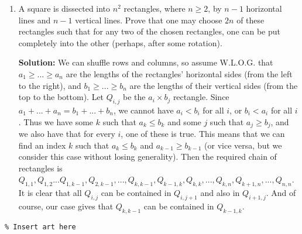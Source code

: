 \documentclass{article}
\begin{document}
\begin{enumerate}[itemsep=\fill]
\item %
A square is dissected into $n^2$ rectangles, where $n\geq 2$, by $n-1$ horizontal lines and $n-1$ vertical lines. Prove that one may choose $2n$ of these rectangles such that for any two of the chosen rectangles, one can be put completely into the other (perhaps, after some rotation).

\textbf{Solution:} We can shuffle rows and columns, so assume W.L.O.G. that $a_1\geq ... \geq a_n$ are the lengths of the rectangles' horizontal sides (from the left to the right), and $b_1\geq ...\geq b_n$ are the lengths of their vertical sides (from the top to the bottom). Let $Q_{i,j}$ be the $a_i\times b_j$ rectangle. Since $a_1+...+a_n=b_1+...+b_n$, we cannot have $a_i<b_i$ for all $i$, or $b_i<a_i$ for all $i$. Thus we have some $k$ such that $a_k\leq b_k$ and some $j$ such that $a_j\geq b_j$, and we also have that for every $i$, one of these is true. This means that we can find an index $k$ such that $a_k\leq b_k$ and $a_{k-1}\geq b_{k-1}$ (or vice versa, but we consider this case without losing generality). Then the required chain of rectangles is $Q_{1,1},Q_{1,2}...Q_{1,k-1},Q_{2,k-1},...,Q_{k,k-1},Q_{k-1,k},Q_{k,k},...,Q_{k,n},Q_{k+1,n},...,Q_{n,n}$. It is clear that all $Q_{i,j}$ can be contained in $Q_{i,j+1}$ and also in $Q_{i+1,j}$. And of course, our case gives that $Q_{k,k-1}$ can be contained in $Q_{k-1,k}$.


\end{enumerate}


\centering
\small
\begin{BVerbatim}
\end{BVerbatim}
\end{document}
